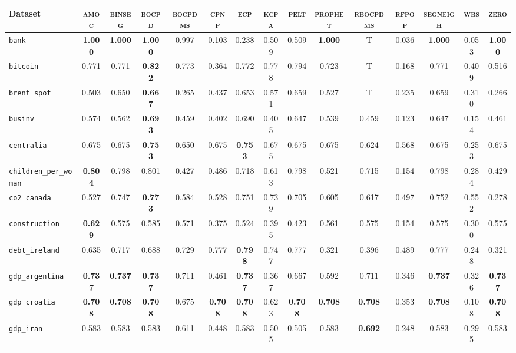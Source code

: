 \begin{tabular}{lcccccccccccccc}
Dataset & \textsc{amoc} & \textsc{binseg} & \textsc{bocpd} & \textsc{bocpdms} & \textsc{cpnp} & \textsc{ecp} & \textsc{kcpa} & \textsc{pelt} & \textsc{prophet} & \textsc{rbocpdms} & \textsc{rfpop} & \textsc{segneigh} & \textsc{wbs} & \textsc{zero}\\
\hline
\verb+bank+ & \textbf{1.000} & \textbf{1.000} & \textbf{1.000} & 0.997 & 0.103 & 0.238 & 0.509 & 0.509 & \textbf{1.000} & T & 0.036 & \textbf{1.000} & 0.053 & \textbf{1.000}\\
\verb+bitcoin+ & 0.771 & 0.771 & \textbf{0.822} & 0.773 & 0.364 & 0.772 & 0.778 & 0.794 & 0.723 & T & 0.168 & 0.771 & 0.409 & 0.516\\
\verb+brent_spot+ & 0.503 & 0.650 & \textbf{0.667} & 0.265 & 0.437 & 0.653 & 0.571 & 0.659 & 0.527 & T & 0.235 & 0.659 & 0.310 & 0.266\\
\verb+businv+ & 0.574 & 0.562 & \textbf{0.693} & 0.459 & 0.402 & 0.690 & 0.405 & 0.647 & 0.539 & 0.459 & 0.123 & 0.647 & 0.154 & 0.461\\
\verb+centralia+ & 0.675 & 0.675 & \textbf{0.753} & 0.650 & 0.675 & \textbf{0.753} & 0.675 & 0.675 & 0.675 & 0.624 & 0.568 & 0.675 & 0.253 & 0.675\\
\verb+children_per_woman+ & \textbf{0.804} & 0.798 & 0.801 & 0.427 & 0.486 & 0.718 & 0.613 & 0.798 & 0.521 & 0.715 & 0.154 & 0.798 & 0.284 & 0.429\\
\verb+co2_canada+ & 0.527 & 0.747 & \textbf{0.773} & 0.584 & 0.528 & 0.751 & 0.739 & 0.705 & 0.605 & 0.617 & 0.497 & 0.752 & 0.552 & 0.278\\
\verb+construction+ & \textbf{0.629} & 0.575 & 0.585 & 0.571 & 0.375 & 0.524 & 0.395 & 0.423 & 0.561 & 0.575 & 0.154 & 0.575 & 0.300 & 0.575\\
\verb+debt_ireland+ & 0.635 & 0.717 & 0.688 & 0.729 & 0.777 & \textbf{0.798} & 0.747 & 0.777 & 0.321 & 0.396 & 0.489 & 0.777 & 0.248 & 0.321\\
\verb+gdp_argentina+ & \textbf{0.737} & \textbf{0.737} & \textbf{0.737} & 0.711 & 0.461 & \textbf{0.737} & 0.367 & 0.667 & 0.592 & 0.711 & 0.346 & \textbf{0.737} & 0.326 & \textbf{0.737}\\
\verb+gdp_croatia+ & \textbf{0.708} & \textbf{0.708} & \textbf{0.708} & 0.675 & \textbf{0.708} & \textbf{0.708} & 0.623 & \textbf{0.708} & \textbf{0.708} & \textbf{0.708} & 0.353 & \textbf{0.708} & 0.108 & \textbf{0.708}\\
\verb+gdp_iran+ & 0.583 & 0.583 & 0.583 & 0.611 & 0.448 & 0.583 & 0.505 & 0.505 & 0.583 & \textbf{0.692} & 0.248 & 0.583 & 0.295 & 0.583\\

\end{tabular}
